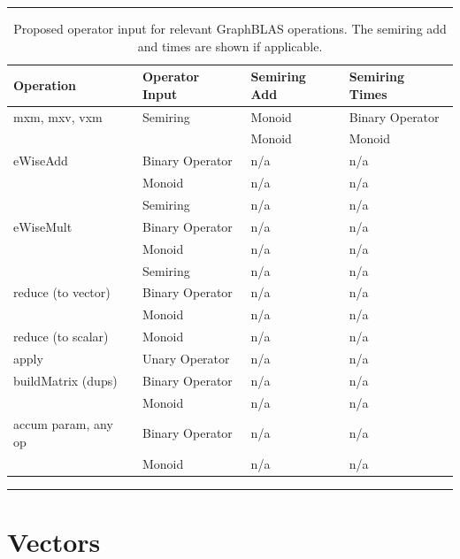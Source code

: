 \begin{table}
    \hrule
    \begin{center}
        \caption{Proposed operator input for relevant GraphBLAS operations. 
        The semiring add and times are shown if applicable.}
        \label{Tab:OperatorInputType}
        \begin{tabular}{l|l|l|l}
        Operation           & Operator Input  & Semiring Add & Semiring Times  \\ \hline
        {\sf mxm, mxv, vxm} & Semiring        & Monoid       & Binary Operator \\
                            &                 & Monoid       & Monoid \\
        {\sf eWiseAdd}      & Binary Operator & n/a          & n/a  \\
                            & Monoid          & n/a          & n/a  \\
                            & Semiring        & n/a          & n/a  \\
        {\sf eWiseMult}     & Binary Operator & n/a          & n/a  \\
                            & Monoid          & n/a          & n/a  \\
                            & Semiring        & n/a          & n/a  \\
  {\sf reduce} (to vector)  & Binary Operator & n/a          & n/a  \\
                            & Monoid          & n/a          & n/a  \\
  {\sf reduce} (to scalar)  & Monoid          & n/a          & n/a  \\
        {\sf apply}         & Unary Operator  & n/a          & n/a  \\
  {\sf buildMatrix} (dups)  & Binary Operator & n/a          & n/a  \\
                            & Monoid          & n/a          & n/a  \\
{\sf accum} param, any op   & Binary Operator & n/a          & n/a  \\
                            & Monoid          & n/a          & n/a  \\
        \end{tabular}
    \end{center}
    \hrule
\end{table}

\section{Vectors}
\label{Sec:Vectors}

